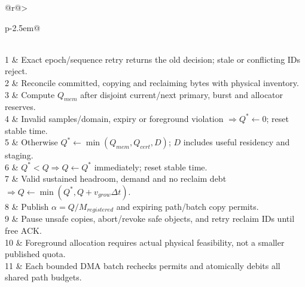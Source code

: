 \begin{algorithm}[tp]
\caption{\textsc{ForegroundBudget}: revocable HBM allowance (revision 3)}
\label{alg:guarded-aimd}
\begin{tabular}{@{}r@{\hspace{0.5em}}>{\raggedright\arraybackslash}p{\dimexpr\columnwidth-2.5em\relax}@{}}
\\
1 & Exact epoch/sequence retry returns the old decision; stale or conflicting IDs reject.\\
2 & Reconcile committed, copying and reclaiming bytes with physical inventory.\\
3 & Compute $Q_{mem}$ after disjoint current/next primary, burst and allocator reserves.\\
4 & Invalid samples/domain, expiry or foreground violation $\Rightarrow Q^*\gets0$; reset stable time.\\
5 & Otherwise $Q^*\gets\min(Q_{mem},Q_{cert},D)$; $D$ includes useful residency and staging.\\
6 & $Q^*<Q\Rightarrow Q\gets Q^*$ immediately; reset stable time.\\
7 & Valid sustained headroom, demand and no reclaim debt $\Rightarrow Q\gets\min(Q^*,Q+v_{grow}\Delta t)$.\\
8 & Publish $\alpha=Q/M_{registered}$ and expiring path/batch copy permits.\\
9 & Pause unsafe copies, abort/revoke safe objects, and retry reclaim IDs until free ACK.\\
10 & Foreground allocation requires actual physical feasibility, not a smaller published quota.\\
11 & Each bounded DMA batch rechecks permits and atomically debits all shared path budgets.\\
\end{tabular}
\end{algorithm}
